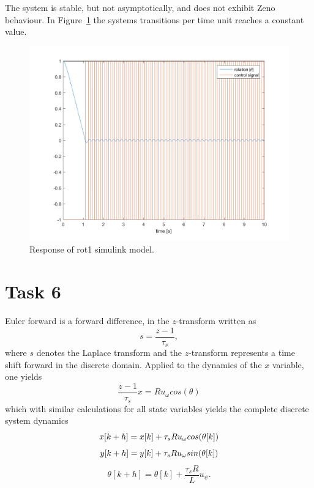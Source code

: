 \documentclass[a4paper,12pt,oneside,onecolumn]{article} %
\begin{document}
	The system is stable, but not asymptotically, and does not exhibit Zeno behaviour. In Figure~\ref{fig:task5_plot} the systems transitions per time unit reaches a constant value.
	\begin{figure}[H]
        \centering
        \includegraphics[scale = 0.5, width=1\linewidth]{../matlab/images/task5_plot.png}
        \caption{Response of rot1 simulink model.}
        \label{fig:task5_plot}
    \end{figure}

\section*{Task 6}

Euler forward is a forward difference, in the $z$-transform written as
\begin{equation}
s = \frac{z-1}{\tau_s},
\end{equation}
where $s$ denotes the Laplace transform and the $z$-transform represents a time shift forward in the discrete domain. Applied to the dynamics of the $x$ variable, one yields
\begin{equation}
\frac{z-1}{\tau_s}x=Ru_\omega cos(\theta)
\end{equation}
which with similar calculations for all state variables yields the complete discrete system dynamics
\begin{equation}
x[k+h] = x[k] + \tau_s R u_\omega cos(\theta [k])	\\
\end{equation}
\begin{equation}
y[k+h] = y[k] + \tau_s R u_\omega sin(\theta [k]) \\
\end{equation}
\begin{equation}
\label{thetadynamics}
\theta[k+h] = \theta [k] + \frac{\tau_s R}{L} u_\psi.
\end{equation}
\end{document}
